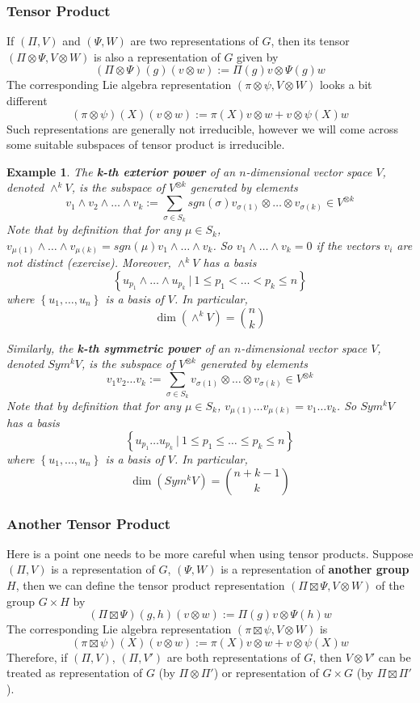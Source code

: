 \documentclass[11pt]{book}
\newtheorem{example}[theorem]{Example}
\begin{document}
\subsubsection{Tensor Product}
If $(\Pi,V)$ and $(\Psi,W)$ are two representations of $G$, then its tensor $(\Pi \otimes \Psi, V \otimes W)$ is also a representation of $G$ given by
$$(\Pi \otimes \Psi)(g)(v\otimes w) := \Pi(g)v \otimes \Psi(g)w$$
The corresponding Lie algebra representation $(\pi \otimes \psi, V \otimes W)$ looks a bit different
$$(\pi \otimes \psi)(X)(v \otimes w) := \pi(X)v \otimes w + v \otimes \psi(X)w$$
Such representations are generally not irreducible, however we will come across some suitable subspaces of tensor product is irreducible.
\begin{example}
The \textbf{k-th exterior power} of an $n$-dimensional vector space $V$, denoted $\wedge^k V$, is the subspace of $V^{\otimes k}$ generated by elements
$$v_1 \wedge v_2 \wedge \dots \wedge v_k := \sum_{\sigma \in S_k} sgn(\sigma) v_{\sigma(1)} \otimes \dots \otimes v_{\sigma(k)} \in V^{\otimes k}$$
Note that by definition that for any $\mu \in S_k$, $v_{\mu(1)} \wedge \dots \wedge v_{\mu(k)} = sgn(\mu) v_1 \wedge \dots \wedge v_k$. So $v_1 \wedge \dots \wedge v_k = 0$ if the vectors $v_i$ are not distinct (exercise). Moreover, $\wedge^k V$ has a basis $$\left\{ u_{p_1} \wedge \dots \wedge u_{p_k}\ \Big|\ 1\leq p_1 < \dots < p_k \leq n \right\}$$
where $\left\{u_1, \dots, u_n\right\}$ is a basis of $V$. In particular,
$$\dim(\wedge^k V) = {n \choose k}$$

Similarly, the \textbf{k-th symmetric power} of an $n$-dimensional vector space $V$, denoted $Sym^k V$, is the subspace of $V^{\otimes k}$ generated by elements
$$v_1 v_2 \dots v_k := \sum_{\sigma \in S_k} v_{\sigma(1)} \otimes \dots \otimes v_{\sigma(k)} \in V^{\otimes k}$$
Note that by definition that for any $\mu \in S_k$, $v_{\mu(1)} \dots  v_{\mu(k)} = v_1  \dots  v_k$. So $Sym^k V$ has a basis $$\left\{ u_{p_1} \dots u_{p_k}\ \Big|\ 1\leq p_1 \leq \dots \leq p_k \leq n \right\}$$
where $\left\{u_1, \dots, u_n\right\}$ is a basis of $V$. In particular,
$$\dim(Sym^k V) = {n+k-1 \choose k}$$
\end{example}

\subsubsection{Another Tensor Product}
Here is a point one needs to be more careful when using tensor products. Suppose $(\Pi,V)$ is a representation of $G$, $(\Psi, W)$ is a representation of \textbf{another group} $H$, then we can define the tensor product representation $(\Pi \boxtimes \Psi, V \otimes W)$ of the group $G \times H$ by
$$(\Pi \boxtimes \Psi)(g,h)(v\otimes w) := \Pi(g)v \otimes \Psi(h)w$$
The corresponding Lie algebra representation $(\pi \boxtimes \psi, V \otimes W)$ is
$$(\pi \boxtimes \psi)(X)(v \otimes w) := \pi(X)v \otimes w + v \otimes \psi(X)w$$
Therefore, if $(\Pi,V)$, $(\Pi,V')$ are both representations of $G$, then $V \otimes V'$ can be treated as representation of $G$ (by $\Pi \otimes \Pi'$) or representation of $G \times G$ (by $\Pi \boxtimes \Pi'$). \\
\end{document}
